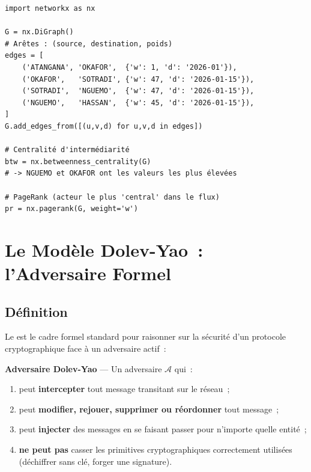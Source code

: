 \begin{lstlisting}[language=bash_forensique,
    caption={Analyse de graphe criminel avec NetworkX}]
import networkx as nx

G = nx.DiGraph()
# Arêtes : (source, destination, poids)
edges = [
    ('ATANGANA', 'OKAFOR',  {'w': 1, 'd': '2026-01'}),
    ('OKAFOR',   'SOTRADI', {'w': 47, 'd': '2026-01-15'}),
    ('SOTRADI',  'NGUEMO',  {'w': 47, 'd': '2026-01-15'}),
    ('NGUEMO',   'HASSAN',  {'w': 45, 'd': '2026-01-15'}),
]
G.add_edges_from([(u,v,d) for u,v,d in edges])

# Centralité d'intermédiarité
btw = nx.betweenness_centrality(G)
# -> NGUEMO et OKAFOR ont les valeurs les plus élevées

# PageRank (acteur le plus 'central' dans le flux)
pr = nx.pagerank(G, weight='w')
\end{lstlisting}

\section{Le Modèle Dolev-Yao~: l'Adversaire Formel}
\label{sec:dolev-yao}

\subsection{Définition}

Le  \cite{dolevyao1983}
est le cadre formel standard pour raisonner sur la sécurité d'un protocole
cryptographique face à un adversaire actif~:

\begin{boxdef}
\textbf{Adversaire Dolev-Yao} --- Un adversaire $\mathcal{A}$ qui~:
\begin{enumerate}
    \item peut \textbf{intercepter} tout message transitant sur le réseau~;
    \item peut \textbf{modifier, rejouer, supprimer ou réordonner} tout message~;
    \item peut \textbf{injecter} des messages en se faisant passer pour
          n'importe quelle entité~;
    \item \textbf{ne peut pas} casser les primitives cryptographiques
          correctement utilisées (déchiffrer sans clé, forger une signature).
\end{enumerate}
\end{boxdef}

